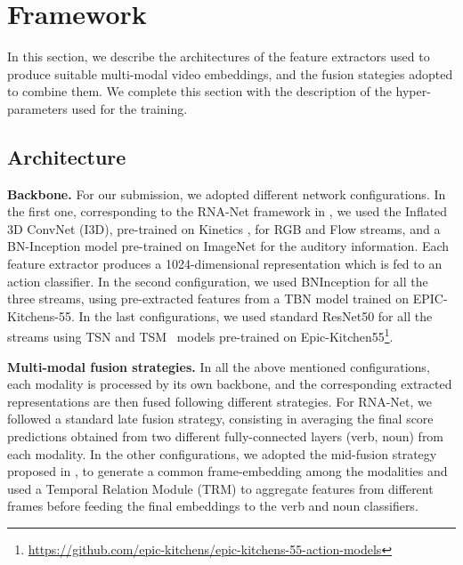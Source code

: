 \section{Framework}
In this section, we describe the architectures of the feature extractors used to produce suitable multi-modal video embeddings, and the fusion stategies adopted to combine them. We complete this section with the description of the hyper-parameters used for the training.

\subsection{Architecture}
\setlength\heavyrulewidth{0.31ex}

\textbf{Backbone.} %
For our submission, we adopted different network configurations.
In the first one, corresponding to the RNA-Net framework in \cite{planamente2021crossdomain}, %
we used the Inflated 3D ConvNet (I3D), pre-trained on Kinetics \cite{carreira2017quo}, for RGB and Flow streams, and a BN-Inception model \cite{ioffe2015batch} pre-trained on ImageNet \cite{imageNet} for the auditory information. %
Each feature extractor produces a 1024-dimensional representation which is fed to an action classifier. %
In the second configuration, we used BNInception for all the three streams, using pre-extracted features from a TBN \cite{munro2020multi} model trained on EPIC-Kitchens-55. In the last configurations, we used standard ResNet50 \cite{he2016deep} %
for all the streams using TSN \cite{wang2016temporal} and TSM~\cite{lin2019tsm} models pre-trained on Epic-Kitchen55\footnote{\url{https://github.com/epic-kitchens/epic-kitchens-55-action-models}}. 

\textbf{Multi-modal fusion strategies.}
In all the above mentioned configurations, each modality is processed by its own backbone, and the corresponding extracted representations are then fused following different strategies.
For RNA-Net, we followed a standard late fusion strategy, consisting in averaging the final score predictions obtained from two different fully-connected layers (verb, noun) from each modality. In the other configurations, we adopted the mid-fusion strategy proposed in \cite{Kazakos_2019_ICCV}, to generate a common frame-embedding among the modalities and used a Temporal Relation Module (TRM) \cite{zhou2018temporal} to aggregate features from different frames %
before feeding the final embeddings to the verb and noun classifiers.%

